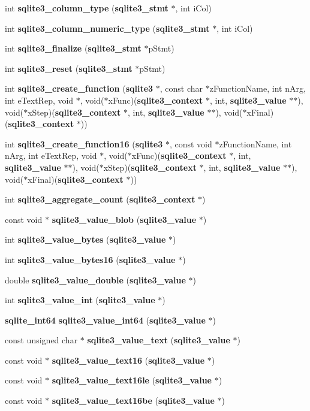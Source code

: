 \begin{DoxyCompactItemize}
int {\bf sqlite3\_\-column\_\-type} ({\bf sqlite3\_\-stmt} $\ast$, int iCol)
\item 
int {\bf sqlite3\_\-column\_\-numeric\_\-type} ({\bf sqlite3\_\-stmt} $\ast$, int iCol)
\item 
int {\bf sqlite3\_\-finalize} ({\bf sqlite3\_\-stmt} $\ast$pStmt)
\item 
int {\bf sqlite3\_\-reset} ({\bf sqlite3\_\-stmt} $\ast$pStmt)
\item 
int {\bf sqlite3\_\-create\_\-function} ({\bf sqlite3} $\ast$, const char $\ast$zFunctionName, int nArg, int eTextRep, void $\ast$, void($\ast$xFunc)({\bf sqlite3\_\-context} $\ast$, int, {\bf sqlite3\_\-value} $\ast$$\ast$), void($\ast$xStep)({\bf sqlite3\_\-context} $\ast$, int, {\bf sqlite3\_\-value} $\ast$$\ast$), void($\ast$xFinal)({\bf sqlite3\_\-context} $\ast$))
\item 
int {\bf sqlite3\_\-create\_\-function16} ({\bf sqlite3} $\ast$, const void $\ast$zFunctionName, int nArg, int eTextRep, void $\ast$, void($\ast$xFunc)({\bf sqlite3\_\-context} $\ast$, int, {\bf sqlite3\_\-value} $\ast$$\ast$), void($\ast$xStep)({\bf sqlite3\_\-context} $\ast$, int, {\bf sqlite3\_\-value} $\ast$$\ast$), void($\ast$xFinal)({\bf sqlite3\_\-context} $\ast$))
\item 
int {\bf sqlite3\_\-aggregate\_\-count} ({\bf sqlite3\_\-context} $\ast$)
\item 
const void $\ast$ {\bf sqlite3\_\-value\_\-blob} ({\bf sqlite3\_\-value} $\ast$)
\item 
int {\bf sqlite3\_\-value\_\-bytes} ({\bf sqlite3\_\-value} $\ast$)
\item 
int {\bf sqlite3\_\-value\_\-bytes16} ({\bf sqlite3\_\-value} $\ast$)
\item 
double {\bf sqlite3\_\-value\_\-double} ({\bf sqlite3\_\-value} $\ast$)
\item 
int {\bf sqlite3\_\-value\_\-int} ({\bf sqlite3\_\-value} $\ast$)
\item 
{\bf sqlite\_\-int64} {\bf sqlite3\_\-value\_\-int64} ({\bf sqlite3\_\-value} $\ast$)
\item 
const unsigned char $\ast$ {\bf sqlite3\_\-value\_\-text} ({\bf sqlite3\_\-value} $\ast$)
\item 
const void $\ast$ {\bf sqlite3\_\-value\_\-text16} ({\bf sqlite3\_\-value} $\ast$)
\item 
const void $\ast$ {\bf sqlite3\_\-value\_\-text16le} ({\bf sqlite3\_\-value} $\ast$)
\item 
const void $\ast$ {\bf sqlite3\_\-value\_\-text16be} ({\bf sqlite3\_\-value} $\ast$)

\end{DoxyCompactItemize}
